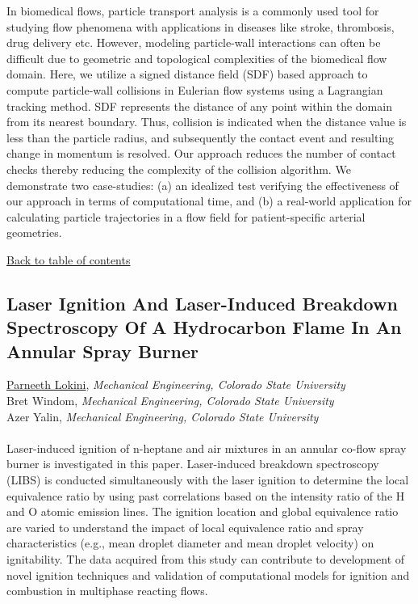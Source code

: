 \noindent In biomedical flows, particle transport analysis is a commonly used tool for studying flow phenomena with applications in diseases like stroke, thrombosis, drug delivery etc. However, modeling particle-wall interactions can often be difficult due to geometric and topological complexities of the biomedical flow domain. Here, we utilize a signed distance field (SDF) based approach to compute particle-wall collisions in Eulerian flow systems using a Lagrangian tracking method. SDF represents the distance of any point within the domain from its nearest boundary. Thus, collision is indicated when the distance value is less than the particle radius, and subsequently the contact event and resulting change in momentum is resolved. Our approach reduces the number of contact checks thereby reducing the complexity of the collision algorithm. We demonstrate two case-studies: (a) an idealized test verifying the effectiveness of our approach in terms of computational time, and (b) a real-world application for calculating particle trajectories in a flow field for patient-specific arterial geometries.  \\ 
\begin{flushright}\vspace{-0.2 in}\hyperlink{toc}{Back to table of contents}\end{flushright}\vspace{-0.2 in}
\hypertarget{ParneethLokini}{\subsection*{\color{CUGOLD} Laser Ignition And Laser-Induced Breakdown Spectroscopy Of A Hydrocarbon Flame In An Annular Spray Burner}} \vsp 
\underline{Parneeth Lokini}, \textit{Mechanical Engineering, Colorado State University}\\ 
{Bret Windom}, \textit{Mechanical Engineering, Colorado State University}\\ 
{Azer Yalin}, \textit{Mechanical Engineering, Colorado State University}\\ 
\vspace{-0.1 in} \\ 
\noindent Laser-induced ignition of n-heptane and air mixtures in an annular co-flow spray burner is investigated in this paper. Laser-induced breakdown spectroscopy (LIBS) is conducted simultaneously with the laser ignition to determine the local equivalence ratio by using past correlations based on the intensity ratio of the H and O atomic emission lines. The ignition location and global equivalence ratio are varied to understand the impact of local equivalence ratio and spray characteristics (e.g., mean droplet diameter and mean droplet velocity) on ignitability. The data acquired from this study can contribute to development of novel ignition techniques and validation of computational models for ignition and combustion in multiphase reacting flows. \\ 
